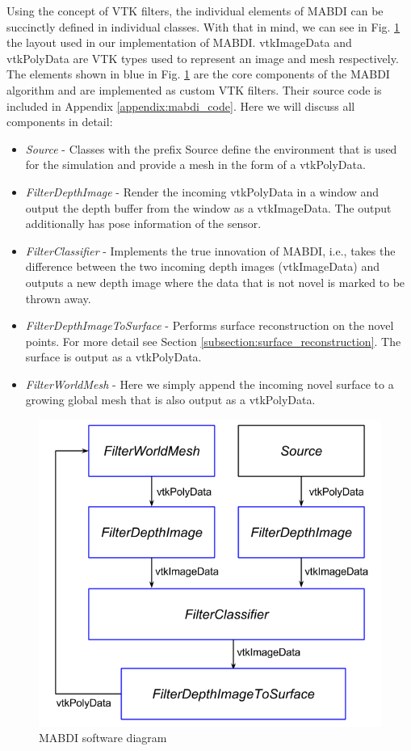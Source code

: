 Using the concept of VTK filters, the individual elements of MABDI can be
succinctly defined in individual classes. With that in mind, we can see in Fig.
\ref{fig:software} the layout used in our implementation of MABDI. vtkImageData
and vtkPolyData are VTK types used to represent an image and mesh respectively.
The elements shown in blue in Fig. \ref{fig:software} are the core components of
the MABDI algorithm and are implemented as custom VTK filters. Their source code
is included in Appendix \ref{appendix:mabdi_code}. Here we will discuss all
components in detail:

\begin{sloppypar}
\begin{itemize}
    \item  \textit{Source} - Classes with the prefix Source define the
    environment that is used for the simulation and provide a mesh in the form
    of a vtkPolyData.
    \item \textit{FilterDepthImage} - Render the incoming vtkPolyData in a
    window and output the depth buffer from the window as a vtkImageData. The
    output additionally has pose information of the sensor.
    \item \textit{FilterClassifier} - Implements the true innovation of MABDI,
    i.e., takes the difference between the two incoming depth images
    (vtkImageData) and outputs a new depth image where the data that is not
    novel is marked to be thrown away.
    \item \textit{FilterDepthImageToSurface} - Performs surface reconstruction
    on the novel points. For more detail see Section
    \ref{subsection:surface_reconstruction}. The surface is output as a
    vtkPolyData.
    \item \textit{FilterWorldMesh} - Here we simply append the incoming novel
    surface to a growing global mesh that is also output as a vtkPolyData.
\end{itemize}
\end{sloppypar}

\begin{figure}[b]%
\centering
\includegraphics[width=.75\textwidth]{figures/diagram_software.png}
\caption{MABDI software diagram}
\label{fig:software}
\end{figure}

